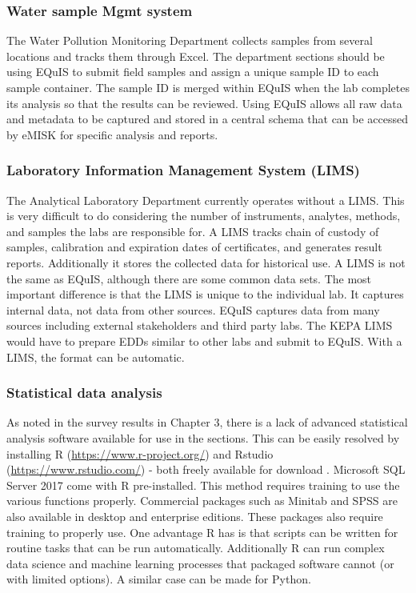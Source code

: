 \subsubsection{Water sample Mgmt system}
The Water Pollution Monitoring Department collects samples from several locations and tracks them through Excel. The department sections should be using EQuIS to submit field samples and assign a unique sample ID to each sample container. The sample ID is merged within EQuIS when the lab completes its analysis so that the results can be reviewed. Using EQuIS allows all raw data and metadata to be captured and stored in a central schema that can be accessed by eMISK for specific analysis and reports.

\subsubsection{Laboratory Information Management System (LIMS)}
The Analytical Laboratory Department currently operates without a LIMS. This is very difficult to do considering the number of instruments, analytes, methods, and samples the labs are responsible for. A LIMS tracks chain of custody of samples, calibration and expiration dates of certificates, and generates result reports. Additionally it stores the collected data for historical use. A LIMS is not the same as EQuIS, although there are some common data sets. The most important difference is that the LIMS is unique to the individual lab. It captures internal data, not data from other sources. EQuIS captures data from many sources including external stakeholders and third party labs. The KEPA LIMS would have to prepare EDDs similar to other labs and submit to EQuIS. With a LIMS, the format can be automatic.

\subsubsection{Statistical data analysis}
As noted in the survey results in Chapter 3, there is a lack of advanced statistical analysis software available for use in the sections. This can be easily resolved by installing R (\url{https://www.r-project.org/}) and Rstudio (\url{https://www.rstudio.com/}) - both freely available for download . Microsoft SQL Server 2017 come with R pre-installed. This method requires training to use the various functions properly. Commercial packages such as Minitab and SPSS are also available in desktop and enterprise editions. These packages also require training to properly use. One advantage R has is that scripts can be written for routine tasks that can be run automatically. Additionally R can run complex data science and machine learning processes that packaged software cannot (or with limited options). A similar case can be made for Python.


